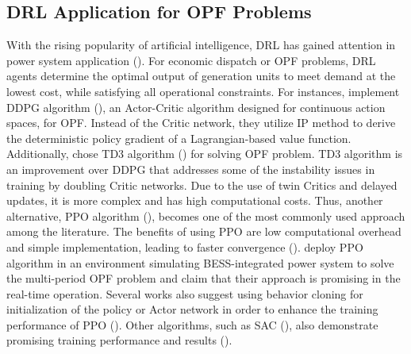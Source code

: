 \subsection{\acrlong{DRL} Application for \gls{OPF} Problems}\label{subsec:DRLApplication}
With the rising popularity of artificial intelligence, \gls{DRL} has gained attention in power system application (\cite{arwa2020reinforcement, chen2022reinforcement, massaoudi2023navigating}). For economic dispatch or \gls{OPF} problems, \gls{DRL} agents determine the optimal output of generation units to meet demand at the lowest cost, while satisfying all operational constraints. For instances, \cite{yan2020real} implement \gls{DDPG} algorithm (\cite{lillicrap2015continuous}), an Actor-Critic algorithm designed for continuous action spaces, for \gls{OPF}. Instead of the Critic network, they utilize \gls{IP} method to derive the deterministic policy gradient of a Lagrangian-based value function. Additionally, \cite{zhen2022design} chose \gls{TD3} algorithm (\cite{fujimoto2018addressing}) for solving \gls{OPF} problem. \gls{TD3} algorithm is an improvement over \gls{DDPG} that addresses some of the instability issues in training by doubling Critic networks. Due to the use of twin Critics and delayed updates, it is more complex and has high computational costs. Thus, another alternative, \gls{PPO} algorithm (\cite{schulman2017proximal}), becomes one of the most commonly used approach among the literature. The benefits of using \gls{PPO} are low computational overhead and simple implementation, leading to faster convergence (\cite{massaoudi2023navigating}). \cite{cao2021deep} deploy \gls{PPO} algorithm in an environment simulating \gls{BESS}-integrated power system to solve the multi-period \gls{OPF} problem and claim that their approach is promising in the real-time operation. 
Several works also suggest using behavior cloning for initialization of the policy or Actor network in order to enhance the training performance of \gls{PPO} (\cite{zhou2020data,zhou2021deep,feng2024safe}). Other algorithms, such as \gls{SAC} (\cite{haarnoja2018soft}), also demonstrate promising training performance and results (\cite{sayed2022feasibility}). 

